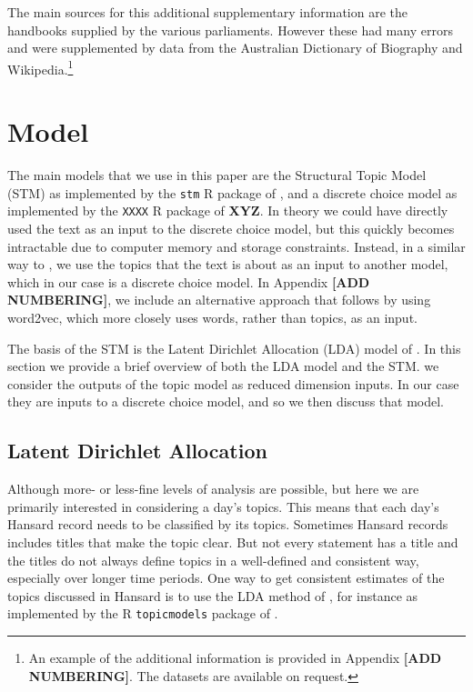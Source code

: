 \documentclass[12pt,]{article}
\theoremstyle{definition}
\theoremstyle{definition}
\theoremstyle{definition}
\theoremstyle{remark}
\begin{document}
The main sources for this additional supplementary information are the
handbooks supplied by the various parliaments. However these had many
errors and were supplemented by data from the Australian Dictionary of
Biography and Wikipedia.\footnote{An example of the additional
  information is provided in Appendix \textbf{{[}ADD NUMBERING{]}}. The
  datasets are available on request.}

\section{Model}\label{model}

The main models that we use in this paper are the Structural Topic Model
(STM) as implemented by the \texttt{stm} R package of
\citet{RobertsStewartAiroldiRPackage}, and a discrete choice model as
implemented by the \texttt{XXXX} R package of \textbf{XYZ}. In theory we
could have directly used the text as an input to the discrete choice
model, but this quickly becomes intractable due to computer memory and
storage constraints. Instead, in a similar way to
\citet{MuellerRauh2018}, we use the topics that the text is about as an
input to another model, which in our case is a discrete choice model. In
Appendix \textbf{{[}ADD NUMBERING{]}}, we include an alternative
approach that follows \citet{Taddy2015} by using word2vec, which more
closely uses words, rather than topics, as an input.

The basis of the STM is the Latent Dirichlet Allocation (LDA) model of
\citet{Blei2003latent}. In this section we provide a brief overview of
both the LDA model and the STM. we consider the outputs of the topic
model as reduced dimension inputs. In our case they are inputs to a
discrete choice model, and so we then discuss that model.

\subsection{Latent Dirichlet
Allocation}\label{latent-dirichlet-allocation}

Although more- or less-fine levels of analysis are possible, but here we
are primarily interested in considering a day's topics. This means that
each day's Hansard record needs to be classified by its topics.
Sometimes Hansard records includes titles that make the topic clear. But
not every statement has a title and the titles do not always define
topics in a well-defined and consistent way, especially over longer time
periods. One way to get consistent estimates of the topics discussed in
Hansard is to use the LDA method of \citet{Blei2003latent}, for instance
as implemented by the R \texttt{topicmodels} package of
\citet{Grun2011}.
\end{document}
